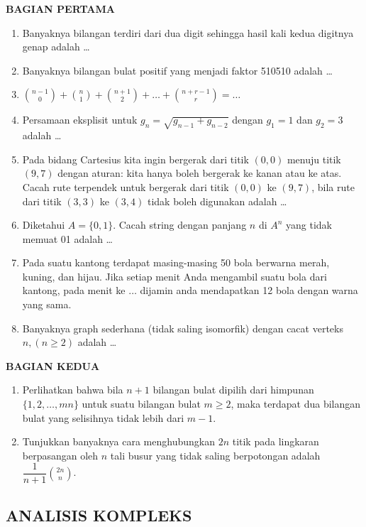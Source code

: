 \documentclass[12pt,twoside]{article}
\begin{document}
\textbf{BAGIAN PERTAMA}
\begin{enumerate}
	\item Banyaknya bilangan terdiri dari dua digit sehingga hasil kali kedua digitnya genap adalah \dots

	\item Banyaknya bilangan bulat positif yang menjadi faktor 510510 adalah \dots

	\item $\displaystyle \binom{n-1}{0}+\binom{n}{1}+\binom{n+1}{2}+\dots+\binom{n+r-1}{r}=\dots$

	\item Persamaan eksplisit untuk $g_n=\sqrt{g_{n-1}+g_{n-2}}$ dengan $g_1=1$ dan $g_2=3$ adalah \dots

	\item Pada bidang Cartesius kita ingin bergerak dari titik $(0,0)$ menuju titik $(9,7)$ dengan aturan: kita hanya boleh bergerak ke kanan atau ke atas. Cacah rute terpendek untuk bergerak dari titik $(0,0)$ ke $(9,7)$, bila rute dari titik $(3,3)$ ke $(3,4)$ tidak boleh digunakan adalah \dots

	\item Diketahui $A=\{0,1\}$. Cacah string dengan panjang $n$ di $A^n$ yang tidak memuat 01 adalah \dots

	\item Pada suatu kantong terdapat masing-masing 50 bola berwarna merah, kuning, dan hijau. Jika setiap menit Anda mengambil suatu bola dari kantong, pada menit ke $\dots$ dijamin anda mendapatkan 12 bola dengan warna yang sama.

	\item Banyaknya graph sederhana (tidak saling isomorfik) dengan cacat verteks $n,(n\geq 2)$ adalah \dots
\end{enumerate}

\newpage \textbf{BAGIAN KEDUA}
\begin{enumerate}
	\item Perlihatkan bahwa bila $n+1$ bilangan bulat dipilih dari himpunan $\{1,2,\dots,mn\}$ untuk suatu bilangan bulat $m\geq 2$, maka terdapat dua bilangan bulat yang selisihnya tidak lebih dari $m-1$.

	\item  Tunjukkan banyaknya cara menghubungkan $2n$ titik pada lingkaran berpasangan oleh $n$ tali busur yang tidak saling berpotongan adalah $\displaystyle \dfrac{1}{n+1}\binom{2n}{n}$.
\end{enumerate}
\newpage \subsection{ANALISIS KOMPLEKS}
\end{document}
